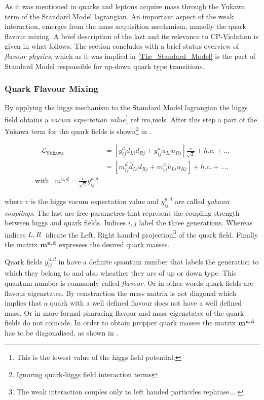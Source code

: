 As it was mentioned in  quarks and leptons acquire mass through the Yukawa term
of the Standard Model lagrangian. An important aspect of the weak interaction, emerges from the mass acquisition mechanism,
namelly the quark flavour mixing. A brief description of the last and its relevance to CP-Violation is given in what follows.
The section concludes with a brief status overview of {\it flavour physics}, which as it was implied in \ref{The_Standard_Model}
is the part of Standard Model responsible for up-down quark type transitions.

\subsubsection{Quark Flavour Mixing}
By applying the higgs mechanism to the Standard Model lagrangian the higgs field obtains a
{\it vacum expectation value}\footnote{This is the lowest value of the higgs field potential.} {\color{red} ref ivo,niels}.
After this step a part of the Yukawa term for the quark fields is
shown\footnote{Ignoring quark-higgs field interaction terms} in .

\begin{align}
  -\mathscr{L}_{\text{Yukawa}} &= \left[ y_{ij}^d \bar{d}_{Li} d_{Rj} + y_{ij}^u \bar{u}_{Li} u_{Rj} \right] \frac{v}{\sqrt{2}} + h.c. + ... \nonumber \\
                               &= \left[ m_{ij}^d \bar{d}_{Li} d_{Rj} + m_{ij}^u \bar{u}_{Li} u_{Rj} \right] + h.c. + ..., \\
                               \text{with} \;\;\; m^{u,d} = \frac{v}{\sqrt{2}} y_{ij}^{u,d} & \nonumber
                               \label{yukawa_flavour}
\end{align}

\noindent where $v$ is the higgs vacum expectation value and $y_{ij}^{u,d}$ are called {\it yukawa couplings}.
The last are free parametres that represent the coupling strength between higgs and quark fields.
Indices $i,j$ label the three generations. Whereas indices $L,R\;$ idicate the Left, Right handed
projection\footnote{The weak interaction couples only to left handed particvles {\color{red} rephrase... }} of the quark field.
Finally the matrix $\bf m^{u,d}$ expresees the desired quark masses.

Quark fields $y_{ij}^{u,d}$ in  have a definite quantum number that labels the generation to which they belong
to and also wheather they are of up or down type. This quantum number is commonly called {\it flavour}. Or in other words quark fields
are flavour eigenstates. By constraction the mass matrix is not diagonal which implies that
a quark with a well defined flavour does not have a well defined mass. Or in more formal pharasing flavour and mass eigenstates of
the quark fields do not coincide. In order to obtain propper quark masses the matrix $\bf m^{u,d}$ has to be diagonalised, as shown in .

